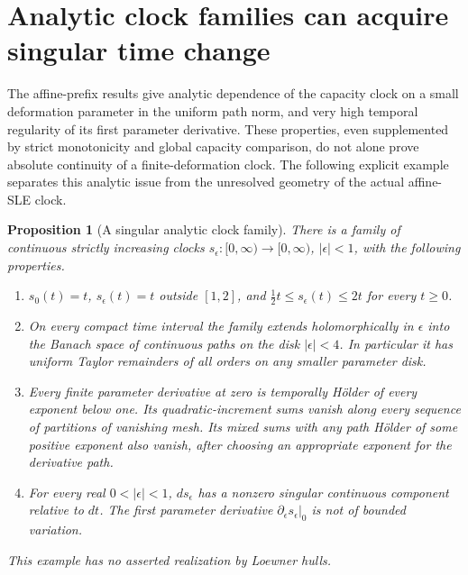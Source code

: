 \documentclass[11pt]{article}
\newtheorem{proposition}[theorem]{Proposition}
\theoremstyle{definition}\newtheorem{definition}[theorem]{Definition}
\theoremstyle{remark}\newtheorem{remark}[theorem]{Remark}
\begin{document}
\section{Analytic clock families can acquire singular time change}
\label{sec:analytic-clock-obstruction}

The affine-prefix results give analytic dependence of the capacity clock
on a small deformation parameter in the uniform path norm, and very high
temporal regularity of its first parameter derivative. These properties,
even supplemented by strict monotonicity and global capacity comparison,
do not alone prove absolute continuity of a finite-deformation clock.
The following explicit example separates this analytic issue from the
unresolved geometry of the actual affine-SLE clock.

\begin{proposition}[A singular analytic clock family]
\label{prop:singular-analytic-clock-family}
There is a family of continuous strictly increasing clocks
$s_\epsilon:[0,\infty)\to[0,\infty)$, $|\epsilon|<1$, with the following
properties.
\begin{enumerate}
\item $s_0(t)=t$, $s_\epsilon(t)=t$ outside $[1,2]$, and
$\tfrac12t\le s_\epsilon(t)\le2t$ for every $t\ge0$.
\item On every compact time interval the family extends holomorphically
in $\epsilon$ into the Banach space of continuous paths on the disk
$|\epsilon|<4$. In particular it has uniform Taylor remainders of all
orders on any smaller parameter disk.
\item Every finite parameter derivative at zero is temporally H\"older
of every exponent below one. Its quadratic-increment sums vanish along
every sequence of partitions of vanishing mesh. Its mixed sums with any
path H\"older of some positive exponent also vanish, after choosing an
appropriate exponent for the derivative path.
\item For every real $0<|\epsilon|<1$, $ds_\epsilon$ has a nonzero
singular continuous component relative to $dt$. The first parameter
derivative $\partial_\epsilon s_\epsilon|_0$ is not of bounded variation.
\end{enumerate}
This example has no asserted realization by Loewner hulls.
\end{proposition}
\end{document}
